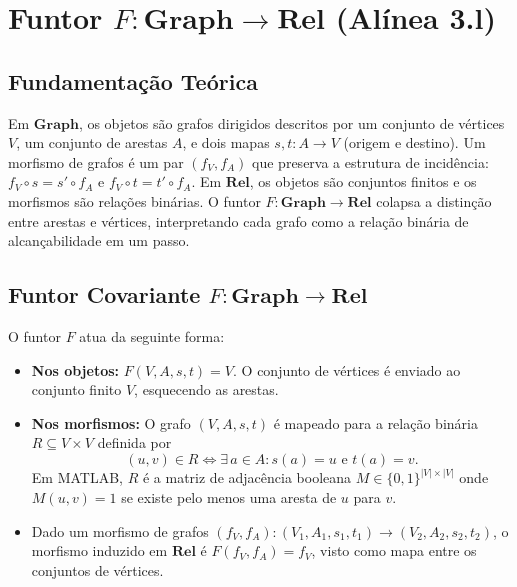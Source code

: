 \section{Funtor $F: \mathbf{Graph} \to \mathbf{Rel}$ (Alínea 3.l)}
\label{sec:functor-graph-rel}

\subsection{Fundamentação Teórica}

Em $\mathbf{Graph}$, os objetos são grafos dirigidos descritos por um conjunto de vértices $V$, um conjunto de arestas $A$, e dois mapas $s, t: A \to V$ (origem e destino). Um morfismo de grafos é um par $(f_V, f_A)$ que preserva a estrutura de incidência: $f_V \circ s = s' \circ f_A$ e $f_V \circ t = t' \circ f_A$. Em $\mathbf{Rel}$, os objetos são conjuntos finitos e os morfismos são relações binárias. O funtor $F: \mathbf{Graph} \to \mathbf{Rel}$ colapsa a distinção entre arestas e vértices, interpretando cada grafo como a relação binária de alcançabilidade em um passo.

\subsection{Funtor Covariante $F: \mathbf{Graph} \to \mathbf{Rel}$}

\begin{definition}
O funtor $F$ atua da seguinte forma:
\begin{itemize}
    \item \textbf{Nos objetos:} $F(V, A, s, t) = V$. O conjunto de vértices é enviado ao conjunto finito $V$, esquecendo as arestas.
    \item \textbf{Nos morfismos:} O grafo $(V, A, s, t)$ é mapeado para a relação binária $R \subseteq V \times V$ definida por
    \[
        (u, v) \in R \iff \exists\, a \in A : s(a) = u \text{ e } t(a) = v.
    \]
    Em MATLAB, $R$ é a matriz de adjacência booleana $M \in \{0,1\}^{|V| \times |V|}$ onde $M(u, v) = 1$ se existe pelo menos uma aresta de $u$ para $v$.
    \item Dado um morfismo de grafos $(f_V, f_A): (V_1, A_1, s_1, t_1) \to (V_2, A_2, s_2, t_2)$, o morfismo induzido em $\mathbf{Rel}$ é $F(f_V, f_A) = f_V$, visto como mapa entre os conjuntos de vértices.
\end{itemize}
\end{definition}

